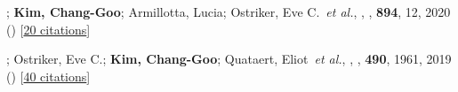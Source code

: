 \item[{30.}]; \textbf{Kim, Chang-Goo}; Armillotta, Lucia; Ostriker, Eve C.~\textit{et al.}, , \apj, \textbf{894}, 12, 2020 () [\href{http://adsabs.harvard.edu/abs/2020ApJ...894...12V}{20 citations}]

\item[{31.}]; Ostriker, Eve C.; \textbf{Kim, Chang-Goo}; Quataert, Eliot~\textit{et al.}, , \mnras, \textbf{490}, 1961, 2019 () [\href{http://adsabs.harvard.edu/abs/2019MNRAS.490.1961E}{40 citations}]